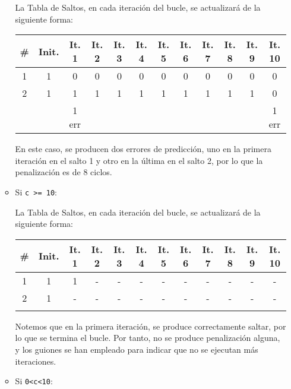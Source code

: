 \begin{ejercicio}
\begin{enumerate}
\begin{itemize}
        La Tabla de Saltos, en cada iteración del bucle, se actualizará de la siguiente forma:
        \begin{center}
            \begin{tabular}{|c|c|c|c|c|c|c|c|c|c|c|c|}
                \hline
                \# & Init. & It. 1& It. 2 & It. 3 & It. 4 & It. 5 & It. 6 & It. 7 & It. 8 & It. 9 & It. 10 \\ 
                \hline
                1 & 1 & 0 & 0 & 0 & 0 & 0 & 0 & 0 & 0 & 0 & 0\\
                2 & 1 & 1 & 1 & 1 & 1 & 1 & 1 & 1 & 1 & 1 & 0\\
                \hline \hline
                & & 1 err & & & & & & & & & 1 err \\
                \hline
            \end{tabular}
        \end{center}

        En este caso, se producen dos errores de predicción, uno en la primera iteración en el salto 1 y otro en la última en el salto 2, por lo que la penalización es de $8$ ciclos.

        \item Si \verb|c >= 10|:
        
        La Tabla de Saltos, en cada iteración del bucle, se actualizará de la siguiente forma:
        \begin{center}
            \begin{tabular}{|c|c|c|c|c|c|c|c|c|c|c|c|}
                \hline
                \# & Init. & It. 1& It. 2 & It. 3 & It. 4 & It. 5 & It. 6 & It. 7 & It. 8 & It. 9 & It. 10 \\ 
                \hline
                1 & 1 & 1 & - & - & - & - & - & - & - & - & -\\
                2 & 1 & - & - & - & - & - & - & - & - & - & -\\
                \hline \hline
                & & & & & & & & & & &\\
                \hline
            \end{tabular}
        \end{center}

        Notemos que en la primera iteración, se produce correctamente saltar, por lo que se termina el bucle. Por tanto, no se produce penalización alguna, y los
        guiones se han empleado para indicar que no se ejecutan más iteraciones.

        \item Si \verb|0<c<10|:
        

\end{itemize}
\end{enumerate}
\end{ejercicio}
